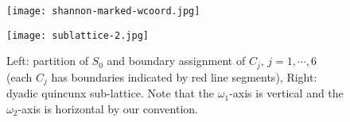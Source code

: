 \begin{figure}[!t]
\centering
\begin{minipage}[c]{.42\textwidth}
\texttt{[image: shannon-marked-wcoord.jpg]}
\end{minipage}\hspace*{3em}
\begin{minipage}[c]{.3\textwidth}
\texttt{[image: sublattice-2.jpg]}
\vspace*{1em}
\end{minipage}
\caption{Left: partition of $S_0$ and boundary assignment of $C_j$, $j = 1,\cdots,6$ (each $C_j$ has boundaries indicated by red line segments), Right: dyadic quincunx sub-lattice. Note that the $\omega_1$-axis is vertical and the $\omega_2$-axis is horizontal by our convention.}
\label{fig: partition}
\vspace*{-5mm}
\end{figure}



